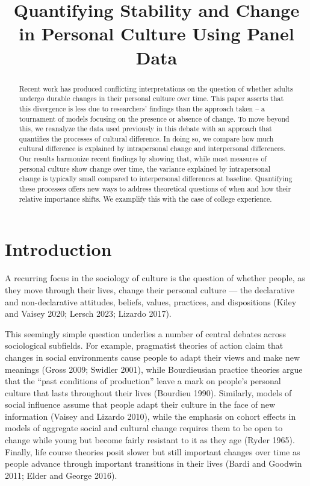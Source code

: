 \documentclass[
  11pt,
]{article}
\title{Quantifying Stability and Change in Personal Culture Using Panel
Data}
\author{}
\date{\vspace{-2.5em}}
\begin{document}
\maketitle
\begin{abstract}
Recent work has produced conflicting interpretations on the question of
whether adults undergo durable changes in their personal culture over
time. This paper asserts that this divergence is less due to
researchers' findings than the approach taken -- a tournament of models
focusing on the presence or absence of change. To move beyond this, we
reanalyze the data used previously in this debate with an approach that
quantifies the processes of cultural difference. In doing so, we compare
how much cultural difference is explained by intrapersonal change and
interpersonal differences. Our results harmonize recent findings by
showing that, while most measures of personal culture show change over
time, the variance explained by intrapersonal change is typically small
compared to interpersonal differences at baseline. Quantifying these
processes offers new ways to address theoretical questions of when and
how their relative importance shifts. We examplify this with the case of
college experience.
\end{abstract}

\hypertarget{introduction}{%
\section{Introduction}\label{introduction}}

A recurring focus in the sociology of culture is the question of whether
people, as they move through their lives, change their personal culture
--- the declarative and non-declarative attitudes, beliefs, values,
practices, and dispositions (Kiley and Vaisey 2020; Lersch 2023; Lizardo
2017).

This seemingly simple question underlies a number of central debates
across sociological subfields. For example, pragmatist theories of
action claim that changes in social environments cause people to adapt
their views and make new meanings (Gross 2009; Swidler 2001), while
Bourdieusian practice theories argue that the ``past conditions of
production'' leave a mark on people's personal culture that lasts
throughout their lives (Bourdieu 1990). Similarly, models of social
influence assume that people adapt their culture in the face of new
information (Vaisey and Lizardo 2010), while the emphasis on cohort
effects in models of aggregate social and cultural change requires them
to be open to change while young but become fairly resistant to it as
they age (Ryder 1965). Finally, life course theories posit slower but
still important changes over time as people advance through important
transitions in their lives (Bardi and Goodwin 2011; Elder and George
2016).
\end{document}
